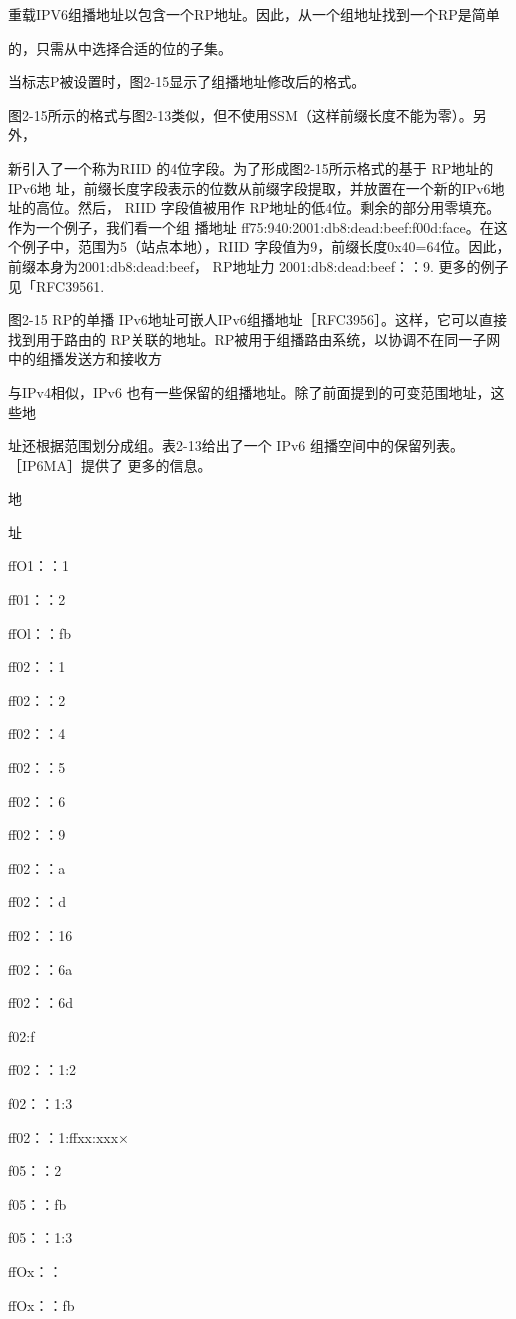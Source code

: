 重载IPV6组播地址以包含一个RP地址。因此，从一个组地址找到一个RP是简单

的，只需从中选择合适的位的子集。

当标志P被设置时，图2-15显示了组播地址修改后的格式。

图2-15所示的格式与图2-13类似，但不使用SSM（这样前缀长度不能为零）。另外，

新引入了一个称为RIID 的4位字段。为了形成图2-15所示格式的基于 RP地址的IPv6地
址，前缀长度字段表示的位数从前缀字段提取，并放置在一个新的IPv6地址的高位。然后，
RIID 字段值被用作 RP地址的低4位。剩余的部分用零填充。作为一个例子，我们看一个组
播地址 ff75:940:2001:db8:dead:beef:f00d:face。在这个例子中，范围为5（站点本地），RIID
字段值为9，前缀长度0x40=64位。因此，前缀本身为2001:db8:dead:beef， RP地址力
2001:db8:dead:beef：：9. 更多的例子见「RFC39561.


图2-15 RP的单播 IPv6地址可嵌人IPv6组播地址［RFC3956］。这样，它可以直接找到用于路由的
RP关联的地址。RP被用于组播路由系统，以协调不在同一子网中的组播发送方和接收方

与IPv4相似，IPv6 也有一些保留的组播地址。除了前面提到的可变范围地址，这些地

址还根据范围划分成组。表2-13给出了一个 IPv6 组播空间中的保留列表。［IP6MA］提供了
更多的信息。

地

址

ffO1：：1

ff01：：2

ffOl：：fb

ff02：：1

ff02：：2

ff02：：4

ff02：：5

ff02：：6

ff02：：9

ff02：：a

ff02：：d

ff02：：16

ff02：：6a

ff02：：6d

f02:f

ff02：：1:2

f02：：1:3

ff02：：1:ffxx:xxx×

f05：：2

f05：：fb

f05：：1:3

ffOx：：

ffOx：：fb

